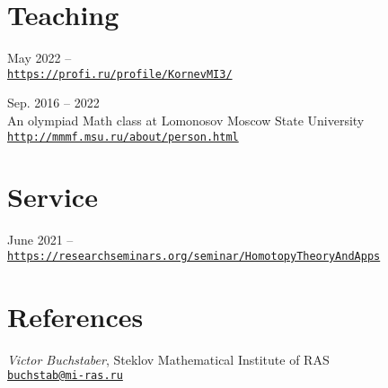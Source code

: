 \documentclass[11pt,letterpaper]{report}
\newcommand{\listitemspace}{0.25em}
\renewenvironment{itemize}
{\begin{list}{}{\setlength{\leftmargin}{0em}
                \setlength{\parskip}{0em}
                \setlength{\itemsep}{\listitemspace}
                \setlength{\parsep}{\listitemspace}}}
{\end{list}}
\begin{document}
    \section*{Teaching}

    \begin{tablist}
    
       \item{May 2022 --} \\ \href{https://profi.ru/profile/KornevMI3/}{\tt https://profi.ru/profile/KornevMI3/} 

        \item{Sep. 2016 -- 2022} \\ An olympiad Math class at Lomonosov Moscow State University\\ \href{http://mmmf.msu.ru/about/person.html}{\tt http://mmmf.msu.ru/about/person.html}
        
    \end{tablist}
    
    
   




    \section*{Service}

    \begin{tablist}

       \item{June 2021 --} \\ \href{https://researchseminars.org/seminar/HomotopyTheoryAndApps}{\tt https://researchseminars.org/seminar/HomotopyTheoryAndApps} 

    \end{tablist}
    
    
    
    
    
    \section*{References}

    \begin{itemize}

       \item[] {\it Victor Buchstaber}, Steklov Mathematical Institute of RAS\\ \href{mailto:buchstab@mi-ras.ru}{\tt buchstab@mi-ras.ru} 

    \end{itemize}
    
\end{document}
